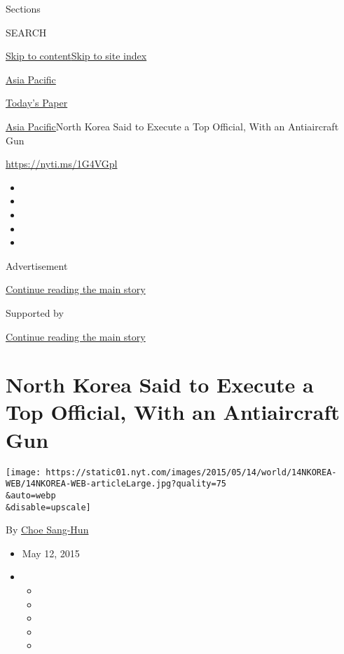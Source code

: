 Sections

SEARCH

\protect\hyperlink{site-content}{Skip to
content}\protect\hyperlink{site-index}{Skip to site index}

\href{https://www.nytimes.com/section/world/asia}{Asia Pacific}

\href{https://myaccount.nytimes.com/auth/login?response_type=cookie\&client_id=vi}{}

\href{https://www.nytimes.com/section/todayspaper}{Today's Paper}

\href{/section/world/asia}{Asia Pacific}\textbar{}North Korea Said to
Execute a Top Official, With an Antiaircraft Gun

\url{https://nyti.ms/1G4VGpl}

\begin{itemize}
\item
\item
\item
\item
\item
\end{itemize}

Advertisement

\protect\hyperlink{after-top}{Continue reading the main story}

Supported by

\protect\hyperlink{after-sponsor}{Continue reading the main story}

\hypertarget{north-korea-said-to-execute-a-top-official-with-an-antiaircraft-gun}{%
\section{North Korea Said to Execute a Top Official, With an
Antiaircraft
Gun}\label{north-korea-said-to-execute-a-top-official-with-an-antiaircraft-gun}}

\texttt{[image: https://static01.nyt.com/images/2015/05/14/world/14NKOREA-WEB/14NKOREA-WEB-articleLarge.jpg?quality=75\\\&auto=webp\\\&disable=upscale]}

By \href{http://www.nytimes.com/by/choe-sang-hun}{Choe Sang-Hun}

\begin{itemize}
\item
  May 12, 2015
\item
  \begin{itemize}
  \item
  \item
  \item
  \item
  \item
  \end{itemize}
\end{itemize}

